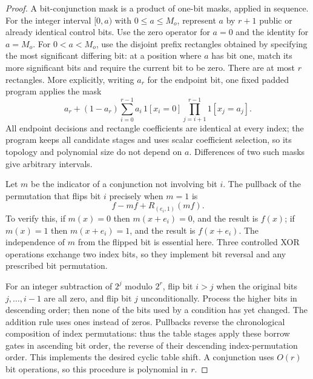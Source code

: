 \begin{proof}
A bit-conjunction mask is a product of one-bit masks, applied in
sequence.  For the integer interval $[0,a)$ with $0\le a\le M_o$,
represent $a$ by $r+1$ public or already identical control bits.
Use the zero operator for $a=0$ and the identity for $a=M_o$.
For $0<a<M_o$, use the disjoint prefix rectangles obtained by
specifying the most significant differing bit: at a position where
$a$ has bit one, match its more significant bits and require the
current bit to be zero.  There are at most $r$ rectangles.
More explicitly, writing $a_r$ for the endpoint bit, one fixed
padded program applies the mask
\[
 a_r+(1-a_r)\sum_{i=0}^{r-1}a_i\,
        1[x_i=0]\prod_{j=i+1}^{r-1}1[x_j=a_j].
\]
All endpoint decisions and rectangle coefficients are identical at
every index; the program keeps all candidate stages and uses scalar
coefficient selection, so its topology and polynomial size do not
depend on $a$.  Differences of two such masks give arbitrary intervals.

Let $m$ be the indicator of a conjunction not involving bit $i$.
The pullback of the permutation that flips bit $i$ precisely when
$m=1$ is
\begin{equation}\label{op:controlled-flip}
                    f-mf+R_{(e_i,1)}(mf).
\end{equation}
To verify this, if $m(x)=0$ then $m(x+e_i)=0$, and the result is $f(x)$;
if $m(x)=1$ then $m(x+e_i)=1$, and the result is $f(x+e_i)$.
The independence of $m$ from the flipped bit is essential here.
Three controlled XOR operations exchange two index bits, so they
implement bit reversal and any prescribed bit permutation.

For an integer subtraction of $2^j$ modulo $2^r$, flip bit $i>j$
when the original bits $j,\ldots,i-1$ are all zero, and flip bit $j$
unconditionally.  Process the higher bits in descending order;
then none of the bits used by a condition has yet changed.
The addition rule uses ones instead of zeros.  Pullbacks reverse the
chronological composition of index permutations: thus the table
stages apply these borrow gates in ascending bit order, the reverse
of their descending index-permutation order.  This implements the
desired cyclic table shift.  A conjunction uses $O(r)$ bit
operations, so this procedure is polynomial in $r$.


\end{proof}
